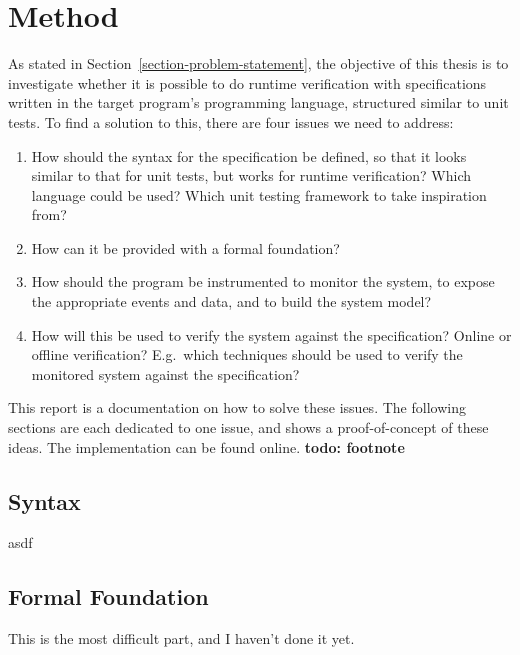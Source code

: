 \documentclass[a4paper,11pt]{kth-mag}
\newcommand{\todo}[1]{\textbf{todo: #1}}
\begin{document}

\pagestyle{newchap}
\chapter{Method} \label{chapter-method}

As stated in Section~\ref{section-problem-statement}, the objective of this
thesis is to investigate whether it is possible to do runtime verification with
specifications written in the target program's programming language, structured
similar to unit tests. To find a solution to this, there are four issues we
need to address:

\begin{enumerate}
	\item How should the syntax for the specification be defined, so that it
		looks similar to that for unit tests, but works for runtime verification?
		Which language could be used? Which unit testing framework to take
		inspiration from?
	\item How can it be provided with a formal foundation?
	\item How should the program be instrumented to monitor the system, to expose
		the appropriate events and data, and to build the system model?
	\item How will this be used to verify the system against the
		specification? Online or offline verification? E.g.\ which techniques
		should be used to verify the monitored system against the specification?
\end{enumerate}

This report is a documentation on how to solve these issues. The following
sections are each dedicated to one issue, and shows a proof-of-concept of these
ideas. The implementation can be found online. \todo{footnote}

\section{Syntax}

asdf

\section{Formal Foundation}

This is the most difficult part, and I haven't done it yet.
\end{document}
